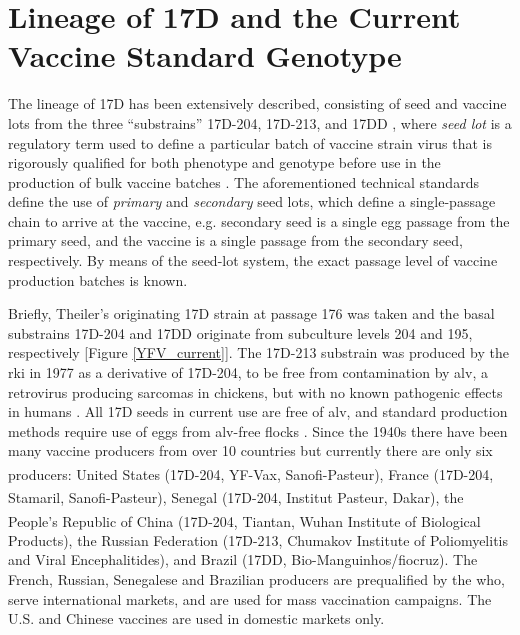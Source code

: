 \section{Lineage of 17D and the Current Vaccine Standard Genotype}
The lineage of 17D has been extensively described, consisting of seed and vaccine lots from the three “substrains” 17D-204, 17D-213, and 17DD \parencite{WorldHealthOrganization:2010wo,Monath:2013cu}, where \emph{seed lot} is a regulatory term used to define a particular batch of vaccine strain virus that is rigorously qualified for both phenotype and genotype before use in the production of bulk vaccine batches \parencite{WorldHealthOrganization:2010wo}. The aforementioned technical standards define the use of \emph{primary} and \emph{secondary} seed lots, which define a single-passage chain to arrive at the vaccine, e.g. secondary seed is a single egg passage from the primary seed, and the vaccine is a single passage from the secondary seed, respectively. By means of the seed-lot system, the exact passage level of vaccine production batches is known. 

Briefly, Theiler’s originating 17D strain at passage 176 was taken and the basal substrains 17D-204 and 17DD originate from subculture levels 204 and 195, respectively [Figure \ref{YFV_current}]. The 17D-213 substrain was produced by the \gls{rki} in 1977 as a derivative of 17D-204, to be free from contamination by \gls{alv}, a retrovirus producing sarcomas in chickens, but with no known pathogenic effects in humans \parencite{Bres:1987wl}. All 17D seeds in current use are free of \gls{alv}, and standard production methods require use of eggs from \gls{alv}-free flocks \parencite{WorldHealthOrganization:2010wo,Monath:2013cu}. Since the 1940s there have been many vaccine producers from over 10 countries but currently there are only six producers: United States (17D-204, YF-Vax\textsuperscript{\textregistered}, Sanofi-Pasteur), France (17D-204, Stamaril\textsuperscript{\textregistered}, Sanofi-Pasteur), Senegal (17D-204, Institut Pasteur, Dakar), the People’s Republic of China (17D-204, Tiantan\textsuperscript{\textregistered}, Wuhan Institute of Biological Products), the Russian Federation (17D-213, Chumakov Institute of Poliomyelitis and Viral Encephalitides), and Brazil (17DD, Bio-Manguinhos/\gls{fiocruz}). The French, Russian, Senegalese and Brazilian producers are prequalified by the \gls{who}, serve international markets, and are used for mass vaccination campaigns. The U.S. and Chinese vaccines are used in domestic markets only. 


